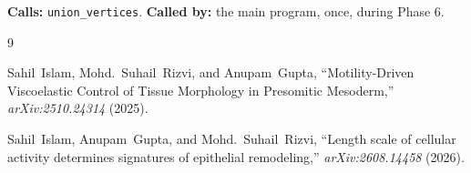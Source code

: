 \documentclass[11pt]{article}
\begin{document}
\textbf{Calls:} \texttt{union\_vertices}. \textbf{Called by:} the main program, once,
during Phase 6.


\begin{thebibliography}{9}

Sahil~Islam, Mohd.~Suhail~Rizvi, and Anupam~Gupta,
``Motility-Driven Viscoelastic Control of Tissue Morphology in Presomitic Mesoderm,''
\emph{arXiv:2510.24314} (2025).

Sahil~Islam, Anupam~Gupta, and Mohd.~Suhail~Rizvi,
``Length scale of cellular activity determines signatures of epithelial
remodeling,'' \emph{arXiv:2608.14458} (2026).

\end{thebibliography}
\end{document}
